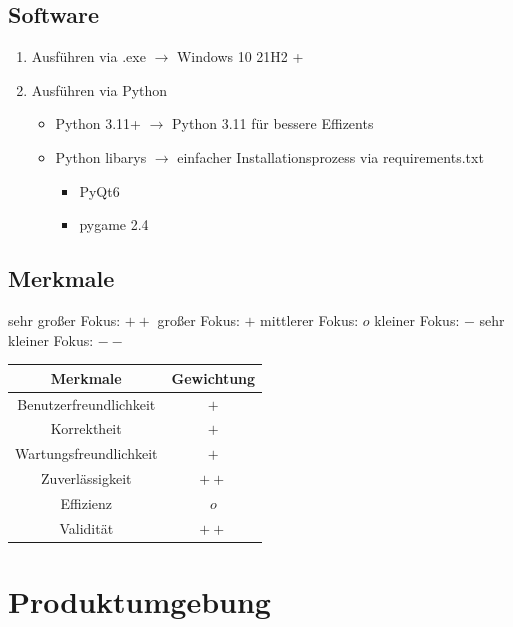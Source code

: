 \documentclass{article}
\begin{document}
\subsection{Software}
\begin{enumerate}
    \item Ausführen via .exe $\rightarrow$ Windows 10 21H2 +
    \item Ausführen via Python
        \begin{itemize}
            \item Python 3.11+ $\rightarrow$ Python 3.11 für bessere Effizents
            \item Python libarys $\rightarrow$ einfacher Installationsprozess via requirements.txt
                \begin{itemize}
                    \item PyQt6
                    \item pygame 2.4
                \end{itemize}
        \end{itemize}
\end{enumerate}

\subsection{Merkmale}
sehr großer Fokus: $++$    großer Fokus: $+$    mittlerer Fokus: $o$    kleiner Fokus: $-$    sehr kleiner Fokus: $--$
\begin{center}
    \begin{tabular}{ |c|c| }
        \hline
        Merkmale & Gewichtung \\
        \hline
        Benutzerfreundlichkeit & $+$ \\
        \hline
        Korrektheit & $+$ \\
        \hline
        Wartungsfreundlichkeit & $+$ \\
        \hline
        Zuverlässigkeit & $++$ \\
        \hline
        Effizienz & $o$ \\
        \hline
        Validität & $++$ \\
        \hline
    \end{tabular}
\end{center}



\newpage
\section{Produktumgebung}\label{section-product}
\end{document}
